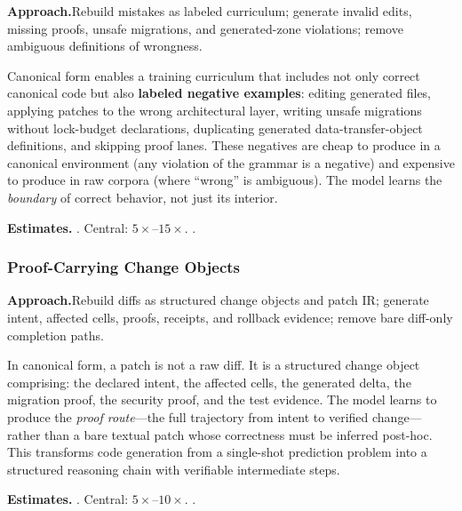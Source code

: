 \smallskip\noindent
\textbf{Approach.}\quad Rebuild mistakes as labeled curriculum; generate invalid edits, missing proofs, unsafe migrations, and generated-zone violations; remove ambiguous definitions of wrongness.

Canonical form enables a training curriculum that includes not only
correct canonical code but also \textbf{labeled negative examples}:
editing generated files, applying patches to the wrong architectural
layer, writing unsafe migrations without lock-budget declarations,
duplicating generated data-transfer-object definitions, and skipping
proof lanes.  These negatives are cheap to produce in a canonical
environment (any violation of the grammar is a negative) and expensive
to produce in raw corpora (where ``wrong'' is ambiguous).  The model
learns the \emph{boundary} of correct behavior, not just its interior.

\smallskip\noindent
\textbf{Estimates.}\quad
{}.\quad
Central: $5\times$--$15\times$.\quad
{}.

\subsubsection{Proof-Carrying Change Objects}
\label{ssec:proof-carrying}

\smallskip\noindent
\textbf{Approach.}\quad Rebuild diffs as structured change objects and patch IR; generate intent, affected cells, proofs, receipts, and rollback evidence; remove bare diff-only completion paths.

In canonical form, a patch is not a raw diff.  It is a structured change
object comprising: the declared intent, the affected cells, the generated
delta, the migration proof, the security proof, and the test evidence.
The model learns to produce the \emph{proof route}---the full
trajectory from intent to verified change---rather than a bare textual
patch whose correctness must be inferred post-hoc.  This transforms
code generation from a single-shot prediction problem into a structured
reasoning chain with verifiable intermediate steps.

\smallskip\noindent
\textbf{Estimates.}\quad
{}.\quad
Central: $5\times$--$10\times$.\quad
{}.

